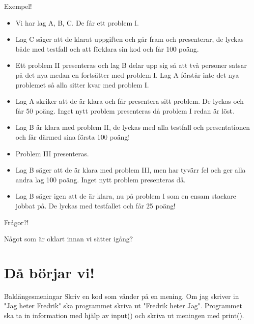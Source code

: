 \documentclass[10pt]{beamer}
\begin{document}
\begin{frame}[fragile]{Exempel!}

\begin{itemize}
\item Vi har lag A, B, C.  De får ett problem I. 
\item Lag C säger att de klarat uppgiften och går fram och presenterar, de lyckas både med testfall och att förklara sin kod och får 100 poäng. 
\item Ett problem II presenteras och lag B delar upp sig så att två personer satsar på det nya medan en fortsätter med problem I. Lag A förstår inte det nya problemet så alla sitter kvar med problem I. 
\item Lag A skriker att de är klara och får presentera sitt problem. De lyckas och får 50 poäng. Inget nytt problem presenteras då problem I redan är löst.
\item Lag B är klara med problem II, de lyckas med alla testfall och presentationen och får därmed sina första 100 poäng! 
\item Problem III presenteras.
\item Lag B säger att de är klara med problem III, men har tyvärr fel och ger alla andra lag 100 poäng. Inget nytt problem presenteras då. 
\item Lag B säger igen att de är klara, nu på problem I som en ensam stackare jobbat på. De lyckas med testfallet och får 25 poäng! 
\end{itemize}
\end{frame}





\begin{frame}[fragile]{Frågor?!}

Något som är oklart innan vi sätter igång? 

\end{frame}




\section{Då börjar vi!}

\begin{frame}{Baklängesmeningar}
Skriv en kod som vänder på en mening. Om jag skriver in "Jag heter Fredrik" ska programmet skriva ut "Fredrik heter Jag". Programmet ska ta in information med hjälp av input() och skriva ut meningen med print(). 

\end{frame}
\end{document}
